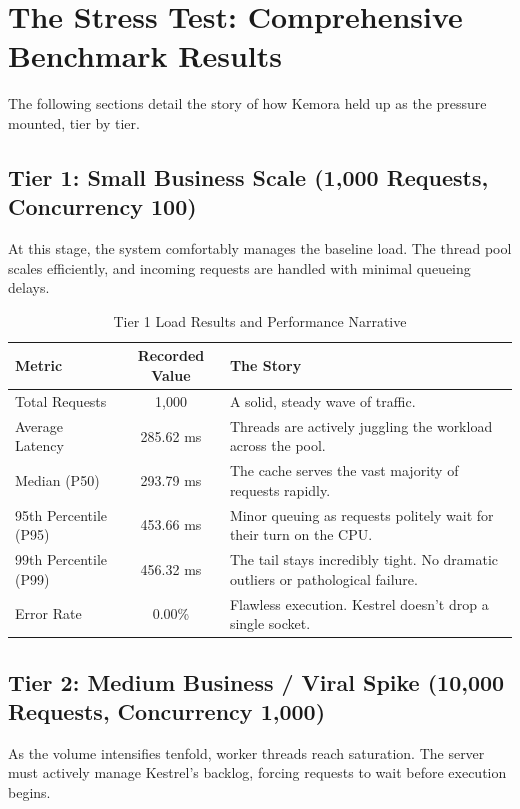 \section{The Stress Test: Comprehensive Benchmark Results}
The following sections detail the story of how Kemora held up as the pressure mounted, tier by tier.

\subsection{Tier 1: Small Business Scale (1,000 Requests, Concurrency 100)}
At this stage, the system comfortably manages the baseline load. The thread pool scales efficiently, and incoming requests are handled with minimal queueing delays.

\begin{table}[H]
\centering
\renewcommand{\arraystretch}{1.3}
\begin{tabular}{|l|c|p{8cm}|}
\hline
\textbf{Metric} & \textbf{Recorded Value} & \textbf{The Story} \\ \hline
Total Requests & 1,000 & A solid, steady wave of traffic. \\ \hline
Average Latency & 285.62 ms & Threads are actively juggling the workload across the pool. \\ \hline
Median (P50) & 293.79 ms & The cache serves the vast majority of requests rapidly. \\ \hline
95th Percentile (P95) & 453.66 ms & Minor queuing as requests politely wait for their turn on the CPU. \\ \hline
99th Percentile (P99) & 456.32 ms & The tail stays incredibly tight. No dramatic outliers or pathological failure. \\ \hline
Error Rate & 0.00\% & Flawless execution. Kestrel doesn't drop a single socket. \\ \hline
\end{tabular}
\caption{Tier 1 Load Results and Performance Narrative}
\label{tab:tier1_load}
\end{table}

\subsection{Tier 2: Medium Business / Viral Spike (10,000 Requests, Concurrency 1,000)}
As the volume intensifies tenfold, worker threads reach saturation. The server must actively manage Kestrel's backlog, forcing requests to wait before execution begins.

